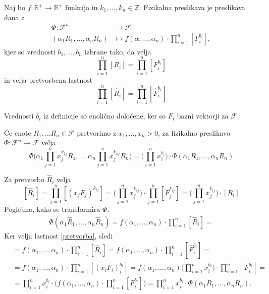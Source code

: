 \documentclass[mat2, tisk]{fmfdelo}
\newcommand{\R}{\mathbb R}
\newcommand{\Z}{\mathbb Z}
\begin{document}
\begin{definicija}
Naj bo $f: \R^+ \rightarrow \R^+$ funkcija in $k_1, \dots, k_n \in \Z$.
Fizikalna preslikava je preslikava dana z 
\begin{align*}
\Phi: \mathcal{F}^n &\rightarrow \mathcal{F} \\
(\alpha_1 R_1, \dots, \alpha_n R_n) &\mapsto f(\alpha, \dots, \alpha_n)\cdot \prod_{i=1}^{n} [F_i^{b_i}],
\end{align*}
kjer so vrednosti $b_1, \dots, b_n$ izbrane tako, da velja 
$$
\prod_{i=1}^{n} [R_i] = \prod_{i=1}^{n} [F_i^{b_i}]
$$
in velja pretvorbena lastnost 
\begin{equation}
\label{pretvorba}
\prod_{i=1}^{n} [\hat{R}_i] = \prod_{i=1}^{n} [\hat{F}_i^{b_i}]
\end{equation}
\end{definicija}

\begin{opomba}
Vrednosti $b_i$ iz definicije so enolično določene, ker so $F_i$ 
bazni vektorji za $\mathcal{F}$.
\end{opomba}

\begin{lema}
\label{lema_pretvorba}
Če enote $R_1, \dots R_n \in \mathcal{F}$ pretvorimo z $x_1, \dots, x_n > 0$, za 
fizikalno preslikavo 
$\Phi: \mathcal{F}^n \rightarrow \mathcal{F}$ velja 
\begin{equation}
\Phi\Big(\alpha_1\prod_{j=1}^n x_j^{k_{1j}} R_1, \dots, \alpha_n \prod_{j=1}^n x_j^{k_{nj}} R_n\Big) = \Big(\prod_{i=1}^n x_i^{b_i}\Big)\cdot \Phi(\alpha_1 R_1, \dots, \alpha_n R_n)
\end{equation}
\end{lema}

\begin{dokaz}
Za pretvorbo $\hat{R}_i$ velja 
$$
[\hat{R}_i] = \prod_{j=1}^n [(x_j F_j)^{k_{ij}}] = \Big(\prod_{j=1}^n x_j^{k_{ij}}\Big)\cdot \prod_{j=1}^n [F_j^{k_{ij}}] = \Big(\prod_{j=1}^n x_j^{k_{ij}}\Big) \cdot [R_i]
$$
Poglejmo, kako se transformira $\Phi$:
\begin{align*}
\Phi(\alpha_1 \hat{R}_1, \dots, \alpha_n \hat{R}_n) = f(\alpha_1, \dots, \alpha_n) \cdot \prod_{i=1}^n [\hat{R}_i] = 
\end{align*}
Ker velja lastnost \ref{pretvorba}, sledi
\begin{align*}
&= f(\alpha_1, \dots, \alpha_n) \cdot \prod_{i=1}^n [\hat{R}_i] = f(\alpha_1, \dots, \alpha_n) \cdot \prod_{i=1}^n [\hat{F}_i^{b_i}] = \\
&= f(\alpha_1, \dots, \alpha_n) \cdot \prod_{i=1}^n [(x_i F_i)_i^{b_i}] = f(\alpha_1, \dots, \alpha_n) \Big(\prod_{i=1}^n x_i^{b_i}\Big) \cdot \prod_{i=1}^n [F_i^{b_i}] = \\
&= \prod_{i=1}^n x_i^{b_i} \cdot \Big(f(\alpha_1, \dots, \alpha_n)\cdot \prod_{i=1}^n [F_i^{b_i}] \Big) = \prod_{i=1}^n x_i^{b_i} \cdot \Phi(\alpha_1 R_1, \dots, \alpha_n R_n).
\end{align*}
\end{dokaz}
\end{document}

